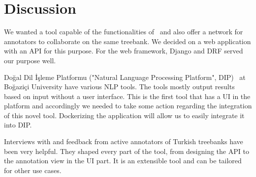 \section{Discussion}
\label{sec:discussion}

We wanted a tool capable of the functionalities of \boatvone\ and also offer a network for annotators to collaborate on the same treebank.
We decided on a web application with an API for this purpose.
For the web framework, Django and DRF served our purpose well.

Doğal Dil İşleme Platformu ("Natural Language Processing Platform", DIP)~\cite{DIP} at Boğaziçi University have various NLP tools.
The tools mostly output results based on input without a user interface.
This is the first tool that has a UI in the platform and accordingly we needed to take some action regarding the integration of this novel tool.
Dockerizing the application will allow us to easily integrate it into DIP.

Interviews with and feedback from active annotators of Turkish treebanks have been very helpful.
They shaped every part of the tool, from designing the API to the annotation view in the UI part.
It is an extensible tool and can be tailored for other use cases.
